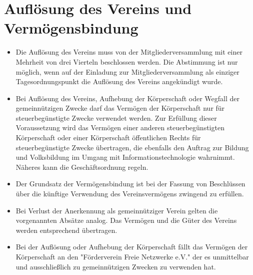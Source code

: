 \documentclass[a4paper,10pt]{article}
\begin{document}
\section{Auflösung des Vereins und Vermögensbindung}
  \begin{itemize}
   \item Die Auflösung des Vereins muss von der Mitgliederversammlung mit einer Mehrheit von drei Vierteln beschlossen werden. Die Abstimmung ist nur möglich, wenn auf der Einladung zur Mitgliederversammlung als einziger Tagesordnungspunkt die Auflösung des Vereins angekündigt wurde.
   \item Bei Auflösung des Vereins, Aufhebung der Körperschaft oder Wegfall der gemeinnützigen Zwecke darf das Vermögen der Körperschaft nur für steuerbegünstigte Zwecke verwendet werden. Zur Erfüllung dieser Voraussetzung wird das Vermögen einer anderen steuerbegünstigten Körperschaft oder einer Körperschaft öffentlichen Rechts für steuerbegünstigte Zwecke übertragen, die ebenfalls den Auftrag zur Bildung und Volksbildung im Umgang mit Informationstechnologie wahrnimmt. Näheres kann die Geschäftsordnung regeln.
   \item Der Grundsatz der Vermögensbindung ist bei der Fassung von Beschlüssen über die künftige Verwendung des Vereinsvermögens zwingend zu erfüllen.
   \item Bei Verlust der Anerkennung als gemeinnütziger Verein gelten die vorgenannten Absätze analog. Das Vermögen und die Güter des Vereins werden entsprechend übertragen.
   \item Bei der Auflösung oder Aufhebung der Körperschaft fällt das Vermögen der Körperschaft an den "Förderverein Freie Netzwerke e.V." der es unmittelbar und ausschließlich zu gemeinnützigen Zwecken zu verwenden hat.
  \end{itemize}
\end{document}
